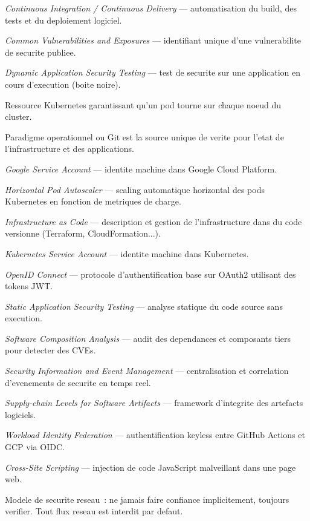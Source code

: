 ﻿%
\begin{description}[style=nextline, leftmargin=3cm]
  \item[CI/CD] \textit{Continuous Integration / Continuous Delivery} --- automatisation du
    build, des tests et du deploiement logiciel.
  \item[CVE] \textit{Common Vulnerabilities and Exposures} --- identifiant unique d'une
    vulnerabilite de securite publiee.
  \item[DAST] \textit{Dynamic Application Security Testing} --- test de securite sur une
    application en cours d'execution (boite noire).
  \item[DaemonSet] Ressource Kubernetes garantissant qu'un pod tourne sur chaque noeud du
    cluster.
  \item[GitOps] Paradigme operationnel ou Git est la source unique de verite pour l'etat
    de l'infrastructure et des applications.
  \item[GSA] \textit{Google Service Account} --- identite machine dans Google Cloud Platform.
  \item[HPA] \textit{Horizontal Pod Autoscaler} --- scaling automatique horizontal des pods
    Kubernetes en fonction de metriques de charge.
  \item[IaC] \textit{Infrastructure as Code} --- description et gestion de l'infrastructure
    dans du code versionne (Terraform, CloudFormation...).
  \item[KSA] \textit{Kubernetes Service Account} --- identite machine dans Kubernetes.
  \item[OIDC] \textit{OpenID Connect} --- protocole d'authentification base sur OAuth2
    utilisant des tokens JWT.
  \item[SAST] \textit{Static Application Security Testing} --- analyse statique du code
    source sans execution.
  \item[SCA] \textit{Software Composition Analysis} --- audit des dependances et composants
    tiers pour detecter des CVEs.
  \item[SIEM] \textit{Security Information and Event Management} --- centralisation et
    correlation d'evenements de securite en temps reel.
  \item[SLSA] \textit{Supply-chain Levels for Software Artifacts} --- framework d'integrite
    des artefacts logiciels.
  \item[WIF] \textit{Workload Identity Federation} --- authentification keyless entre
    GitHub Actions et GCP via OIDC.
  \item[XSS] \textit{Cross-Site Scripting} --- injection de code JavaScript malveillant
    dans une page web.
  \item[Zero Trust] Modele de securite reseau~: ne jamais faire confiance implicitement,
    toujours verifier. Tout flux reseau est interdit par defaut.
\end{description}
